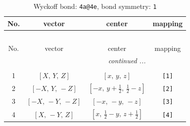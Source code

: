\documentclass[fleqn,8pt]{jsarticle}
\begin{document}
\begin{longtable}{cccc}
\caption{Wyckoff bond: {\tt 4a@4e}, bond symmetry: {\tt 1}}
 \\
 \hline \hline
No. & vector & center & mapping \\ \hline \endfirsthead

\multicolumn{3}{l}{\tablename\ \thetable{}} \\
 \hline \hline
No. & vector & center & mapping \\ \hline \endhead

 \hline \hline
\multicolumn{3}{r}{\footnotesize\it continued ...} \\ \endfoot

 \hline \hline
\multicolumn{3}{r}{} \\ \endlastfoot

1 & $\left[ X,\, Y,\, Z \right]$ & $\left[ x,\, y,\, z \right]$ & {\tt [1]} \\ \hline
2 & $\left[ - X,\, Y,\, - Z \right]$ & $\left[ - x,\, y + \frac{1}{2},\, \frac{1}{2} - z \right]$ & {\tt [2]} \\ \hline
3 & $\left[ - X,\, - Y,\, - Z \right]$ & $\left[ - x,\, - y,\, - z \right]$ & {\tt [3]} \\ \hline
4 & $\left[ X,\, - Y,\, Z \right]$ & $\left[ x,\, \frac{1}{2} - y,\, z + \frac{1}{2} \right]$ & {\tt [4]} \\
\end{longtable}
\end{document}
